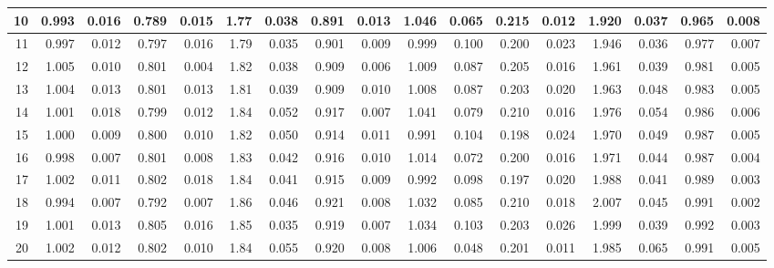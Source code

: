 \documentclass[
]{article}
\begin{document}
\begin{table}[H]
\begin{table}
{\begin{tabular}{r|r|r|r|r|r|r|r|r|r|r|r|r|r|r|r|r}
\hline
10 & 0.993 & 0.016 & 0.789 & 0.015 & 1.77 & 0.038 & 0.891 & 0.013 & 1.046 & 0.065 & 0.215 & 0.012 & 1.920 & 0.037 & 0.965 & 0.008\\
\hline
11 & 0.997 & 0.012 & 0.797 & 0.016 & 1.79 & 0.035 & 0.901 & 0.009 & 0.999 & 0.100 & 0.200 & 0.023 & 1.946 & 0.036 & 0.977 & 0.007\\
\hline
12 & 1.005 & 0.010 & 0.801 & 0.004 & 1.82 & 0.038 & 0.909 & 0.006 & 1.009 & 0.087 & 0.205 & 0.016 & 1.961 & 0.039 & 0.981 & 0.005\\
\hline
13 & 1.004 & 0.013 & 0.801 & 0.013 & 1.81 & 0.039 & 0.909 & 0.010 & 1.008 & 0.087 & 0.203 & 0.020 & 1.963 & 0.048 & 0.983 & 0.005\\
\hline
14 & 1.001 & 0.018 & 0.799 & 0.012 & 1.84 & 0.052 & 0.917 & 0.007 & 1.041 & 0.079 & 0.210 & 0.016 & 1.976 & 0.054 & 0.986 & 0.006\\
\hline
15 & 1.000 & 0.009 & 0.800 & 0.010 & 1.82 & 0.050 & 0.914 & 0.011 & 0.991 & 0.104 & 0.198 & 0.024 & 1.970 & 0.049 & 0.987 & 0.005\\
\hline
16 & 0.998 & 0.007 & 0.801 & 0.008 & 1.83 & 0.042 & 0.916 & 0.010 & 1.014 & 0.072 & 0.200 & 0.016 & 1.971 & 0.044 & 0.987 & 0.004\\
\hline
17 & 1.002 & 0.011 & 0.802 & 0.018 & 1.84 & 0.041 & 0.915 & 0.009 & 0.992 & 0.098 & 0.197 & 0.020 & 1.988 & 0.041 & 0.989 & 0.003\\
\hline
18 & 0.994 & 0.007 & 0.792 & 0.007 & 1.86 & 0.046 & 0.921 & 0.008 & 1.032 & 0.085 & 0.210 & 0.018 & 2.007 & 0.045 & 0.991 & 0.002\\
\hline
19 & 1.001 & 0.013 & 0.805 & 0.016 & 1.85 & 0.035 & 0.919 & 0.007 & 1.034 & 0.103 & 0.203 & 0.026 & 1.999 & 0.039 & 0.992 & 0.003\\
\hline
20 & 1.002 & 0.012 & 0.802 & 0.010 & 1.84 & 0.055 & 0.920 & 0.008 & 1.006 & 0.048 & 0.201 & 0.011 & 1.985 & 0.065 & 0.991 & 0.005\\
\hline
\end{tabular}}
\end{table}
\end{table}
\end{document}
